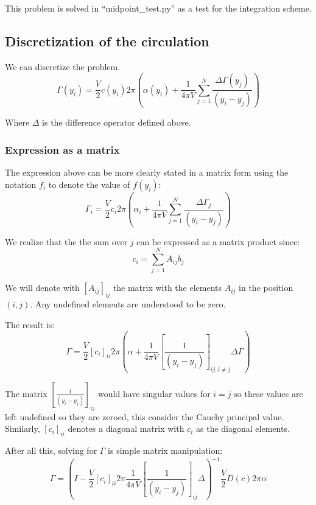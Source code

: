 This problem is solved in ``midpoint\_test.py'' as a test for the integration scheme.

\subsection{Discretization of the circulation}
We can discretize the problem.
\begin{equation}
    \Gamma(y_i) = \frac{V}{2} c(y_i) 2 \pi \left( \alpha(y_i) + \frac{1}{4\pi V}\sum_{j=1}^{N} \frac{\Delta\Gamma(y_j)}{\left(y_i - y_j\right)} \right)
\end{equation}

Where $\Delta$ is the difference operator defined above.

\subsubsection{Expression as a matrix}
The expression above can be more clearly stated in a matrix form using the notation $f_i$ to denote the value of $f(y_i)$:
\begin{equation}
    \Gamma_i = \frac{V}{2} c_i 2 \pi \left( \alpha_i + \frac{1}{4\pi V}\sum_{j=1}^{N} \frac{\Delta\Gamma_j}{\left(y_i - y_j\right)} \right)
\end{equation}

We realize that the the sum over $j$ can be expressed as a matrix product since:
\begin{equation}
    c_i = \sum_{j=1}^{N} A_{ij}b_j
\end{equation}

We will denote with $\left[A_{ij}\right]_{ij}$ the matrix with the elements $A_{ij}$ in the position $(i,j)$. Any undefined elements are understood to be zero.

The result is:
\begin{equation}
    \Gamma= \frac{V}{2} \left[c_i\right]_{ii} 2 \pi \left( \alpha + \frac{1}{4\pi V} \left[\frac{1}{\left(y_i - y_j\right)}\right]_{ij,i\neq j}\Delta\Gamma \right)
\end{equation}

The matrix $\left[\frac{1}{\left(y_i - y_j\right)}\right]_{ij}$ would have singular values for $i=j$ so these values are left undefined so they are zeroed, this consider the Cauchy principal value. Similarly, $\left[c_i\right]_{ii}$ denotes a diagonal matrix with $c_i$ as the diagonal elements.

After all this, solving for  $\Gamma$ is simple matrix manipulation:
\begin{equation}
    \Gamma = \left(I- \frac{V}{2} \left[c_i\right]_{ii} 2 \pi \frac{1}{4\pi V} \left[\frac{1}{\left(y_i - y_j\right)}\right]_{ij}\Delta \right)^{-1} \frac{V}{2} D(c) 2 \pi \alpha
\end{equation}

